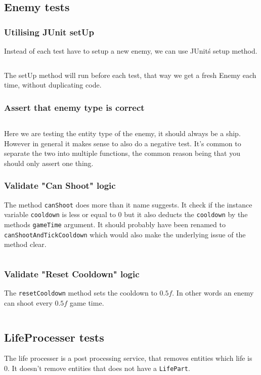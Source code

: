 \subsection{Enemy tests}
\subsubsection{Utilising JUnit setUp}
Instead of each test have to setup a new enemy, we can use JUnit\'s setup
method.
\inputminted{java}{code/test_lab/enemy/setup.java}
The setUp method will run before each test, that way we get a fresh Enemy each
time, without duplicating code.


\subsubsection{Assert that enemy type is correct}
\inputminted{java}{code/test_lab/enemy/entity_type.java}
Here we are testing the entity type of the enemy, it should always be a ship.
However in general it makes sense to also do a negative test.
It's common to separate the two into multiple functions, the common reason being that you should only
assert one thing.

\subsubsection{Validate "Can Shoot" logic}
%
The method \texttt{canShoot} does more than it name suggests. It check if the
instance variable \texttt{cooldown} is less or equal to $0$ but it also deducts
the \texttt{cooldown} by the methods \texttt{gameTime} argument. It should
probably have been renamed to \texttt{canShootAndTickCooldown} which would also
make the underlying issue of the method clear.

\inputminted{java}{code/test_lab/enemy/can_shoot.java}

\subsubsection{Validate "Reset Cooldown" logic}
The \texttt{resetCooldown} method sets the cooldown to $0.5f$. In other words an enemy can shoot every $0.5f$ game time.

\inputminted{java}{code/test_lab/enemy/reset_cooldown.java}

\subsection{LifeProcesser tests}
The life processer is a post processing service, that removes entities which
life is 0. It doesn't remove entities that does not have a \texttt{LifePart}.
\inputminted{java}{code/test_lab/life_processer.java}
